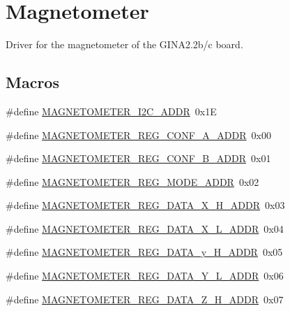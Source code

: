 \hypertarget{group___magnetometer}{}\section{Magnetometer}
\label{group___magnetometer}


Driver for the magnetometer of the G\+I\+N\+A2.\+2b/c board.  


\subsection*{Macros}
\begin{DoxyCompactItemize}
\item 
\#define \hyperlink{group___magnetometer_ga9bcee5ba1f09340b453fb5b2bf670369}{M\+A\+G\+N\+E\+T\+O\+M\+E\+T\+E\+R\+\_\+\+I2\+C\+\_\+\+A\+D\+DR}~0x1E
\item 
\#define \hyperlink{group___magnetometer_ga3c9504bb0b31caf63bc09ddbb2702fa7}{M\+A\+G\+N\+E\+T\+O\+M\+E\+T\+E\+R\+\_\+\+R\+E\+G\+\_\+\+C\+O\+N\+F\+\_\+\+A\+\_\+\+A\+D\+DR}~0x00
\item 
\#define \hyperlink{group___magnetometer_ga68157561e758fb40c6a46679120497f0}{M\+A\+G\+N\+E\+T\+O\+M\+E\+T\+E\+R\+\_\+\+R\+E\+G\+\_\+\+C\+O\+N\+F\+\_\+\+B\+\_\+\+A\+D\+DR}~0x01
\item 
\#define \hyperlink{group___magnetometer_ga9a1098bc16f8d68c19c1d5a8cf55821f}{M\+A\+G\+N\+E\+T\+O\+M\+E\+T\+E\+R\+\_\+\+R\+E\+G\+\_\+\+M\+O\+D\+E\+\_\+\+A\+D\+DR}~0x02
\item 
\#define \hyperlink{group___magnetometer_ga38f670a1d421420dd11e231787a0bc09}{M\+A\+G\+N\+E\+T\+O\+M\+E\+T\+E\+R\+\_\+\+R\+E\+G\+\_\+\+D\+A\+T\+A\+\_\+\+X\+\_\+\+H\+\_\+\+A\+D\+DR}~0x03
\item 
\#define \hyperlink{group___magnetometer_ga98ab0f7fffb8804d54a292997b8a64c1}{M\+A\+G\+N\+E\+T\+O\+M\+E\+T\+E\+R\+\_\+\+R\+E\+G\+\_\+\+D\+A\+T\+A\+\_\+\+X\+\_\+\+L\+\_\+\+A\+D\+DR}~0x04
\item 
\#define \hyperlink{group___magnetometer_ga815d948184315b9a645f5825006e2efd}{M\+A\+G\+N\+E\+T\+O\+M\+E\+T\+E\+R\+\_\+\+R\+E\+G\+\_\+\+D\+A\+T\+A\+\_\+y\+\_\+\+H\+\_\+\+A\+D\+DR}~0x05
\item 
\#define \hyperlink{group___magnetometer_ga4b05ccc972058b9dbe887ac187729d7c}{M\+A\+G\+N\+E\+T\+O\+M\+E\+T\+E\+R\+\_\+\+R\+E\+G\+\_\+\+D\+A\+T\+A\+\_\+\+Y\+\_\+\+L\+\_\+\+A\+D\+DR}~0x06
\item 
\#define \hyperlink{group___magnetometer_ga86db539887cf10e85b8d29bbdcdfa8e2}{M\+A\+G\+N\+E\+T\+O\+M\+E\+T\+E\+R\+\_\+\+R\+E\+G\+\_\+\+D\+A\+T\+A\+\_\+\+Z\+\_\+\+H\+\_\+\+A\+D\+DR}~0x07

\end{DoxyCompactItemize}
